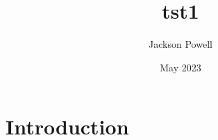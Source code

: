 \documentclass[12pt]{amsart}
\title{tst1}
\author{Jackson Powell}
\date{May 2023}
\begin{document}
\maketitle

\section{Introduction}
\end{document}
